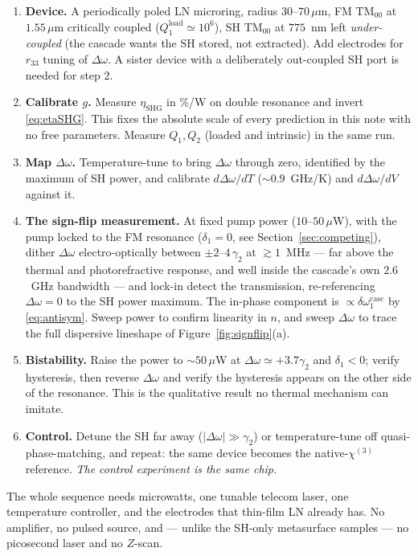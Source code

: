 \documentclass[11pt,a4paper]{article}
\newcommand{\chithree}{\chi^{(3)}}
\newcommand{\Dom}{\Delta\omega}
\newcommand{\etanorm}{\eta_{\text{SHG}}}
\begin{document}
\begin{enumerate}[leftmargin=1.8em,itemsep=3pt]
\item \textbf{Device.}  A periodically poled LN microring, radius
  $30$--$70\,\mu$m, FM TM$_{00}$ at $1.55\,\mu$m critically coupled
  ($Q_1^{\text{load}}\simeq10^6$), SH TM$_{00}$ at $775$~nm left
  \emph{under-coupled} (the cascade wants the SH stored, not extracted).
  Add electrodes for $r_{33}$ tuning of $\Dom$.  A sister device with a
  deliberately out-coupled SH port is needed for step 2.
\item \textbf{Calibrate $g$.}  Measure $\etanorm$ in \%/W on double
  resonance and invert \eqref{eq:etaSHG}.  This fixes the absolute scale
  of every prediction in this note with no free parameters.  Measure
  $Q_1,Q_2$ (loaded and intrinsic) in the same run.
\item \textbf{Map $\Dom$.}  Temperature-tune to bring $\Dom$ through
  zero, identified by the maximum of SH power, and calibrate
  $d\Dom/dT$ ($\sim0.9$~GHz/K) and $d\Dom/dV$ against it.
\item \textbf{The sign-flip measurement.}  At fixed pump power
  ($10$--$50\,\mu$W), with the pump locked to the FM resonance
  ($\delta_1=0$, see Section~\ref{sec:competing}), dither $\Dom$
  electro-optically between $\pm2$--$4\,\gamma_2$ at $\gtrsim1$~MHz ---
  far above the thermal and photorefractive response, and well inside
  the cascade's own $2.6$~GHz bandwidth --- and lock-in
  detect the transmission, re-referencing $\Dom=0$ to the SH power
  maximum.  The in-phase component is
  $\propto\delta\omega_1^{\text{casc}}$ by \eqref{eq:antisym}.
  Sweep power to confirm linearity in $n$, and sweep $\Dom$ to trace the
  full dispersive lineshape of Figure~\ref{fig:signflip}(a).
\item \textbf{Bistability.}  Raise the power to $\sim50\,\mu$W at
  $\Dom\simeq+3.7\gamma_2$ and $\delta_1<0$; verify hysteresis, then
  reverse $\Dom$ and verify the hysteresis appears on the other side of
  the resonance.  This is the qualitative result no thermal mechanism
  can imitate.
\item \textbf{Control.}  Detune the SH far away ($|\Dom|\gg\gamma_2$) or
  temperature-tune off quasi-phase-matching, and repeat: the same device
  becomes the native-$\chithree$ reference.  \emph{The control experiment
  is the same chip.}
\end{enumerate}

The whole sequence needs microwatts, one tunable telecom laser, one
temperature controller, and the electrodes that thin-film LN already
has.  No amplifier, no pulsed source, and --- unlike the SH-only
metasurface samples --- no picosecond laser and no $Z$-scan.
\end{document}
